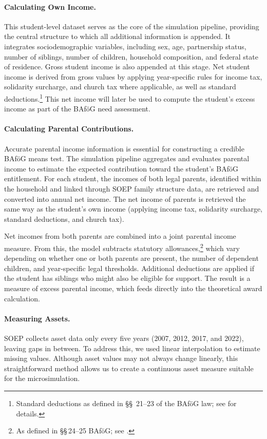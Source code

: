 \paragraph{Calculating Own Income.} 
This student-level dataset serves as the core of the simulation pipeline, providing the central structure to which all additional information is appended. 
It integrates sociodemographic variables, including sex, age, partnership status, number of siblings, number of children, household composition, and federal state of residence. 
Gross student income is also appended at this stage. 
Net student income is derived from gross values by applying year-specific rules for income tax, solidarity surcharge, and church tax where applicable, as well as standard deductions.\footnote{
Standard deductions as defined in §§~21–23 of the BAföG law; see \citet{bafoeg_law} for details.
} 
This net income will later be used to compute the student’s excess income as part of the BAföG need assessment.

\paragraph{Calculating Parental Contributions.}
Accurate parental income information is essential for constructing a credible BAföG means test. 
The simulation pipeline aggregates and evaluates parental income to estimate the expected contribution toward the student’s BAföG entitlement. 
For each student, the incomes of both legal parents, identified within the household and linked through SOEP family structure data, are retrieved and converted into annual net income. 
The net income of parents is retrieved the same way as the student's own income (applying income tax, solidarity surcharge, standard deductions, and church tax).

Net incomes from both parents are combined into a joint parental income measure. 
From this, the model subtracts statutory allowances,\footnote{As defined in §§\,24--25 BAföG; see \citet{bafoeg_law}.} which vary depending on whether one or both parents are present, the number of dependent children, and year-specific legal thresholds.
Additional deductions are applied if the student has siblings who might also be eligible for support. 
The result is a measure of excess parental income, which feeds directly into the theoretical award calculation.


\paragraph{Measuring Assets.}
SOEP collects asset data only every five years (2007, 2012, 2017, and 2022), leaving gaps in between. 
To address this, we used linear interpolation to estimate missing values. 
Although asset values may not always change linearly, this straightforward method allows us to create a continuous asset measure suitable for the microsimulation.


